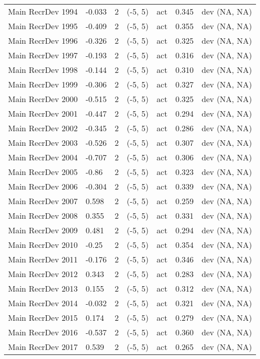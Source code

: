 \documentclass[11pt,
  letterpaper,
]{article}
\begin{document}
\begin{landscape}
\begin{longtable}[t]{>{\raggedright\arraybackslash}p{7.5cm}lllll>{\raggedright\arraybackslash}p{3.5cm}}
Main RecrDev 1994 & -0.033 & 2 & (-5, 5) & act & 0.345 & dev (NA, NA)\\
Main RecrDev 1995 & -0.409 & 2 & (-5, 5) & act & 0.355 & dev (NA, NA)\\
Main RecrDev 1996 & -0.326 & 2 & (-5, 5) & act & 0.325 & dev (NA, NA)\\
Main RecrDev 1997 & -0.193 & 2 & (-5, 5) & act & 0.316 & dev (NA, NA)\\
Main RecrDev 1998 & -0.144 & 2 & (-5, 5) & act & 0.310 & dev (NA, NA)\\
Main RecrDev 1999 & -0.306 & 2 & (-5, 5) & act & 0.327 & dev (NA, NA)\\
Main RecrDev 2000 & -0.515 & 2 & (-5, 5) & act & 0.325 & dev (NA, NA)\\
Main RecrDev 2001 & -0.447 & 2 & (-5, 5) & act & 0.294 & dev (NA, NA)\\
Main RecrDev 2002 & -0.345 & 2 & (-5, 5) & act & 0.286 & dev (NA, NA)\\
Main RecrDev 2003 & -0.526 & 2 & (-5, 5) & act & 0.307 & dev (NA, NA)\\
Main RecrDev 2004 & -0.707 & 2 & (-5, 5) & act & 0.306 & dev (NA, NA)\\
Main RecrDev 2005 & -0.86 & 2 & (-5, 5) & act & 0.323 & dev (NA, NA)\\
Main RecrDev 2006 & -0.304 & 2 & (-5, 5) & act & 0.339 & dev (NA, NA)\\
Main RecrDev 2007 & 0.598 & 2 & (-5, 5) & act & 0.259 & dev (NA, NA)\\
Main RecrDev 2008 & 0.355 & 2 & (-5, 5) & act & 0.331 & dev (NA, NA)\\
Main RecrDev 2009 & 0.481 & 2 & (-5, 5) & act & 0.294 & dev (NA, NA)\\
Main RecrDev 2010 & -0.25 & 2 & (-5, 5) & act & 0.354 & dev (NA, NA)\\
Main RecrDev 2011 & -0.176 & 2 & (-5, 5) & act & 0.346 & dev (NA, NA)\\
Main RecrDev 2012 & 0.343 & 2 & (-5, 5) & act & 0.283 & dev (NA, NA)\\
Main RecrDev 2013 & 0.155 & 2 & (-5, 5) & act & 0.312 & dev (NA, NA)\\
Main RecrDev 2014 & -0.032 & 2 & (-5, 5) & act & 0.321 & dev (NA, NA)\\
Main RecrDev 2015 & 0.174 & 2 & (-5, 5) & act & 0.279 & dev (NA, NA)\\
Main RecrDev 2016 & -0.537 & 2 & (-5, 5) & act & 0.360 & dev (NA, NA)\\
Main RecrDev 2017 & 0.539 & 2 & (-5, 5) & act & 0.265 & dev (NA, NA)\\

\end{longtable}
\end{landscape}
\end{document}
